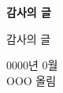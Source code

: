 \newpage

\thispagestyle{plain}
\begin{center}
    \Large
    \textbf{감사의 글}
\end{center}

감사의 글

\begin{flushright}
    0000년 0월\\
    OOO 올림\\
\end{flushright}
